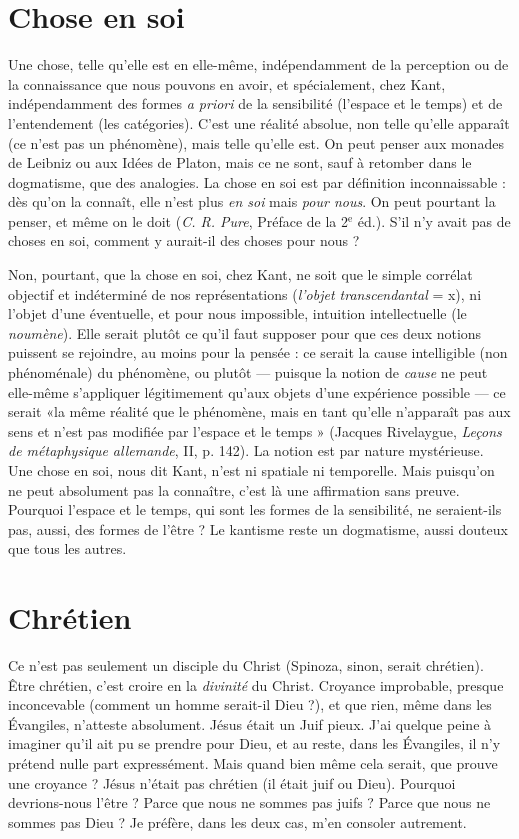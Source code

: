 \section{Chose en soi}
Une chose, telle qu’elle est en elle-même, indépendamment
de la perception ou de la connaissance que nous
pouvons en avoir, et spécialement, chez Kant, indépendamment des formes
{\it a priori} de la sensibilité (l’espace et le temps) et de l’entendement (les catégories).
C’est une réalité absolue, non telle qu’elle apparaît (ce n’est pas un phénomène),
mais telle qu’elle est. On peut penser aux monades de Leibniz ou aux
Idées de Platon, mais ce ne sont, sauf à retomber dans le dogmatisme, que des
analogies. La chose en soi est par définition inconnaissable : dès qu’on la
connaît, elle n’est plus {\it en soi} mais {\it pour nous}. On peut pourtant la penser, et
même on le doit ({\it C. R. Pure}, Préface de la 2$^\text{e}$ éd.). S’il n’y avait pas de choses
en soi, comment y aurait-il des choses pour nous ?

Non, pourtant, que la chose en soi, chez Kant, ne soit que le simple corrélat
objectif et indéterminé de nos représentations ({\it l'objet transcendantal} = x), ni
l’objet d’une éventuelle, et pour nous impossible, intuition intellectuelle (le
{\it noumène}). Elle serait plutôt ce qu’il faut supposer pour que ces deux notions
puissent se rejoindre, au moins pour la pensée : ce serait la cause intelligible
(non phénoménale) du phénomène, ou plutôt — puisque la notion de {\it cause} ne
peut elle-même s'appliquer légitimement qu’aux objets d’une expérience possible —
ce serait «la même réalité que le phénomène, mais en tant qu’elle
n'apparaît pas aux sens et n’est pas modifiée par l’espace et le temps » (Jacques
Rivelaygue, {\it Leçons de métaphysique allemande}, II, p. 142). La notion est par
nature mystérieuse. Une chose en soi, nous dit Kant, n’est ni spatiale ni temporelle.
Mais puisqu'on ne peut absolument pas la connaître, c’est là une affirmation
sans preuve. Pourquoi l’espace et le temps, qui sont les formes de la
sensibilité, ne seraient-ils pas, aussi, des formes de l'être ? Le kantisme reste un
dogmatisme, aussi douteux que tous les autres.

\section{Chrétien}
Ce n’est pas seulement un disciple du Christ (Spinoza, sinon,
serait chrétien). Être chrétien, c’est croire en la {\it divinité} du
Christ. Croyance improbable, presque inconcevable (comment un homme
serait-il Dieu ?), et que rien, même dans les Évangiles, n’atteste absolument.
Jésus était un Juif pieux. J'ai quelque peine à imaginer qu’il ait pu se prendre
pour Dieu, et au reste, dans les Évangiles, il n’y prétend nulle part expressément.
Mais quand bien même cela serait, que prouve une croyance ?
Jésus n’était pas chrétien (il était juif ou Dieu). Pourquoi devrions-nous
l'être ? Parce que nous ne sommes pas juifs ? Parce que nous ne sommes pas
Dieu ? Je préfère, dans les deux cas, m’en consoler autrement.

